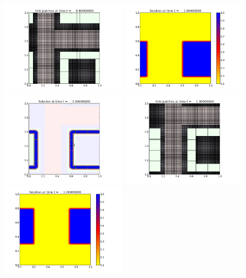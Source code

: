 \documentclass[11pt]{article}
\begin{document}
\vskip 10pt 
\includegraphics[width=0.475\textwidth]{frame0004fig2.png}
\vskip 10pt 
\includegraphics[width=0.475\textwidth]{frame0005fig0.png}
\includegraphics[width=0.475\textwidth]{frame0005fig1.png}
\vskip 10pt 
\includegraphics[width=0.475\textwidth]{frame0005fig2.png}
\vskip 10pt 
\includegraphics[width=0.475\textwidth]{frame0006fig0.png}
\end{document}
